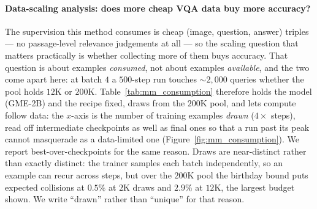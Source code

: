 \paragraph{Data-scaling analysis: does more cheap VQA data buy more accuracy?} The supervision
this method consumes is cheap (image, question, answer) triples --- no passage-level relevance
judgements at all --- so the scaling question that matters practically is whether collecting more
of them buys accuracy. That question is about examples \emph{consumed}, not about examples
\emph{available}, and the two come apart here: at batch $4$ a $500$-step run touches
${\sim}2{,}000$ queries whether the pool holds $12$K or $200$K. Table~\ref{tab:mm_consumption}
therefore holds the model (\textsc{GME-2B}) and the recipe fixed, draws from the $200$K pool, and
lets compute follow data: the $x$-axis is the number of training examples \emph{drawn}
($4 \times$ steps), read off intermediate checkpoints as well as final ones so that a run past its
peak cannot masquerade as a data-limited one (Figure~\ref{fig:mm_consumption}). We report
best-over-checkpoints for the same reason. Draws are near-distinct rather than exactly distinct:
the trainer samples each batch independently, so an example can recur across steps, but over the
$200$K pool the birthday bound puts expected collisions at $0.5\%$ at $2$K draws and $2.9\%$ at
$12$K, the largest budget shown. We write ``drawn'' rather than ``unique'' for that reason.

